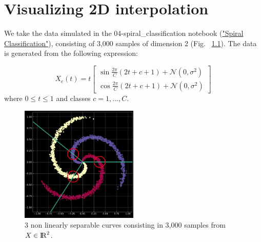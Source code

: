 \chapter{Visualizing 2D interpolation}


We take the data simulated in the 04-spiral\_classification notebook (\href{https://github.com/Atcold/pytorch-Deep-Learning-Minicourse/blob/master/04-spiral\_classification.ipynb} {"Spiral Classification"}), 
consisting of 3,000 samples of dimension 2 (Fig. ~\ref{fig:NonLinearlySeparableParametricCurves2}). 
The data is generated from the following expression:

\[
X_c(t) = t
\begin{bmatrix}
    \sin{\frac{2\pi}{C} (2t+c+1) + \mathcal{N} (0, \sigma^2)} \\
    \cos{\frac{2\pi}{C} (2t+c+1) + \mathcal{N} (0, \sigma^2)}
\end{bmatrix}
\]
where $0 \leq t \leq 1$ and classes $c=1, ..., C$.


\begin{figure}[ht]
\centering
\includegraphics[width=0.5\textwidth]{lectures/04-a/images/NonLinearlySeparableParametricCurves.png}
\caption{3 non linearly separable curves consisting in 3,000 samples from $X \in {{\rm I\!R}}^2$.}
\label{fig:NonLinearlySeparableParametricCurves2}
\end{figure}

